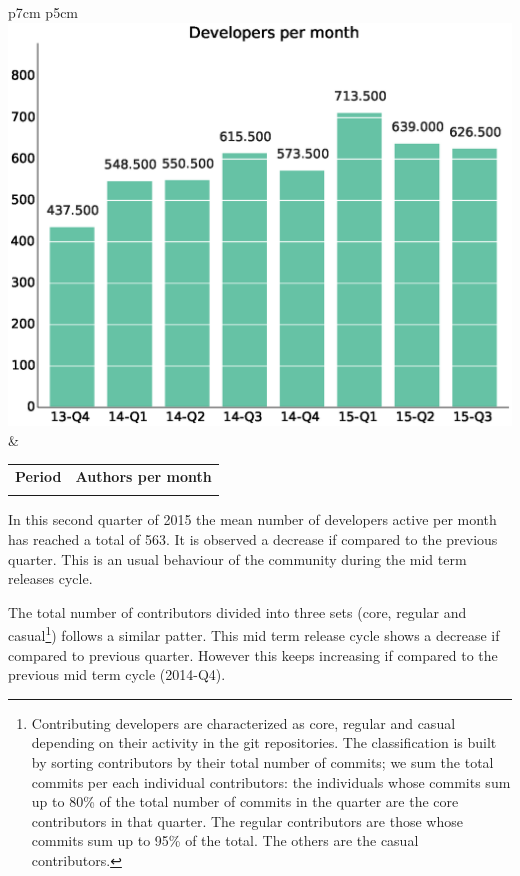 \documentclass[a4wide,11pt]{report}
\begin{document}


\begin{tabular}{p{7cm} p{5cm}}
    \vspace{0pt} 
    \includegraphics[scale=.35]{figs/authors_month.eps}
    & 
    \vspace{0pt}
    \begin{tabular}{l|r|}%
    \bfseries Period & \bfseries Authors per month%
   \csvreader[head to column names]{data/authors_month.csv}{}%
   {\\ & \authormonth}
   \end{tabular}
\end{tabular}

In this second quarter of 2015 the mean number of developers active per
month has reached a total of 563. It is observed a decrease if compared to
the previous quarter. This is an usual behaviour of the community during the
mid term releases cycle.

The total number of contributors divided into three sets (core,
regular and casual\footnote{Contributing developers are characterized
as core, regular and casual depending on their activity in the git
repositories. The classification is built by sorting contributors by
their total number of commits; we sum the total commits per each
individual contributors: the individuals whose commits sum up to 80\%
of the total number of commits in the quarter are the core
contributors in that quarter. The regular contributors are those whose
commits sum up to 95\% of the total. The others are the casual
contributors.}) follows a similar patter. This mid term release cycle shows
a decrease if compared to previous quarter. However this keeps increasing
if compared to the previous mid term cycle (2014-Q4).
\end{document}
